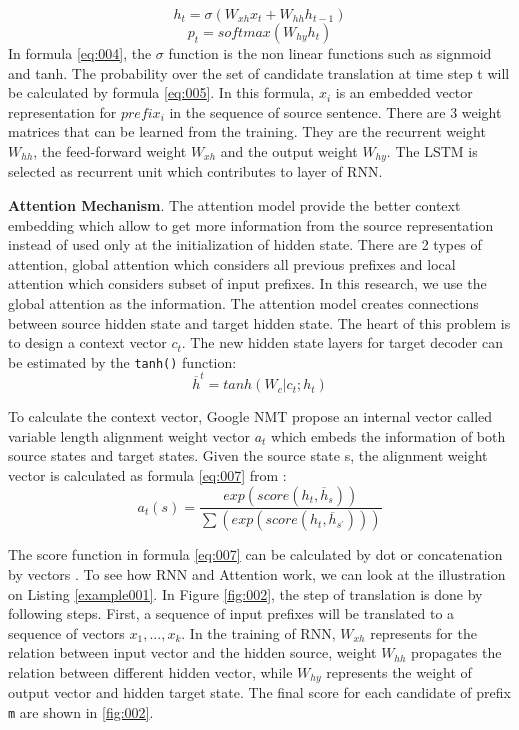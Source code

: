 \begin{equation} 
\label{eq:004}
h_{t} = \sigma (W_{xh}x_{t}+W_{hh}h_{t-1})
\end{equation}
\begin{equation} 
\label{eq:005}
p_{t} = softmax(W_{hy}h_{t})
\end{equation}
In formula \ref{eq:004}, the $\sigma$ function is the non linear functions such as signmoid and tanh. The probability over the set of candidate translation at time step t will be calculated by formula \ref{eq:005}. In this formula, $x_{i}$ is an embedded vector representation for $prefix_{i}$ in the sequence of source sentence. There are 3 weight matrices that can be learned from the training. They are the recurrent weight $W_{hh}$, the feed-forward weight $W_{xh}$ and the output weight $W_{hy}$. The LSTM is selected as recurrent unit which contributes to layer of RNN.

\textbf{Attention Mechanism}. The attention model provide the better context embedding which allow to get more information from the source representation instead of used only at the initialization of hidden state. There are 2 types of attention, global attention which considers all previous prefixes and local attention which considers subset of input prefixes. In this research, we use the global attention as the information. 
The attention model creates connections between source hidden state and target hidden state. The heart of this problem is to design a context vector $c_{t}$. The new hidden state layers for target decoder can be estimated by the \texttt{tanh()} function:
\begin{equation} 
\label{eq:006}
\overline{h}^{t} =tanh(W_{c}|c_{t};h_{t})
\end{equation}

To calculate the context vector, Google NMT propose an internal vector called variable length alignment weight vector $a_{t}$ which embeds the information of both source states and target states. Given the source state s, the alignment weight vector is calculated as formula \ref{eq:007} from \cite{040}:
\begin{equation} 
\label{eq:007}
a_{t}(s)=\frac{exp(score(h_{t},\overline{h}_{s}))}{\sum (exp(score(h_{t},\overline{h}_{s^{'}})))}
\end{equation}

The score function in formula \ref{eq:007} can be calculated by dot or concatenation by vectors \cite{40}. To see how RNN and Attention work, we can look at the illustration on Listing \ref{example001}. In Figure \ref{fig:002}, the step of translation is done by following steps. First, a sequence of input prefixes will be translated to a sequence of vectors $x_{1},...,x_{k}$. In the training of RNN, $W_{xh}$ represents for the relation between input vector and the hidden source, weight $W_{hh}$ propagates the relation between different hidden vector, while $W_{hy}$ represents the weight of output vector and hidden target state. The final score for each candidate of prefix \texttt{m} are shown in \ref{fig:002}.

